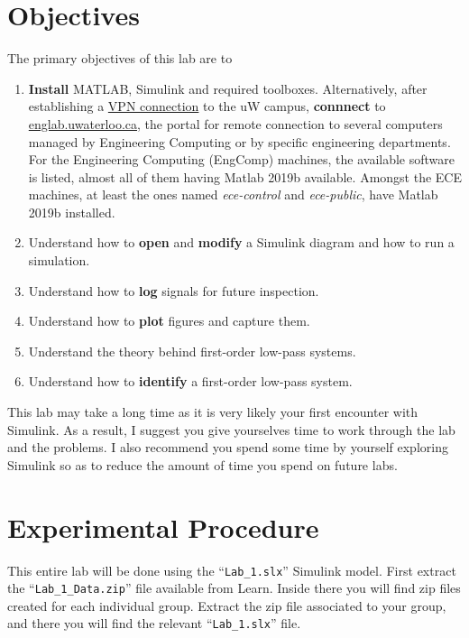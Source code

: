 \section{Objectives}
The primary objectives of this lab are to
\begin{enumerate}[label=(\arabic*)]
  \item{
    \textbf{Install} MATLAB, Simulink and required toolboxes.
    Alternatively, after establishing a \href{https://uwaterloo.ca/information-systems-technology/services/virtual-private-network-vpn/about-virtual-private-network-vpn} {VPN connection} to the uW campus, \textbf{connnect} to
    \url{englab.uwaterloo.ca}, the portal for remote connection to several computers managed by Engineering Computing or by specific engineering departments. For the Engineering Computing (EngComp) machines, the available software is listed, almost all of them having Matlab 2019b available. Amongst the ECE machines, at least the ones named \emph{ece-control} and \emph{ece-public}, have Matlab 2019b installed. 
  }
  \item{
    Understand how to \textbf{open} and \textbf{modify}
    a Simulink diagram and how to run a simulation.
  }
  \item{
    Understand how to \textbf{log} signals for future inspection.
  }
  \item{
    Understand how to \textbf{plot} figures and capture them.
  }
  \item{
    Understand the theory behind first-order low-pass systems.
  }
  \item{
    Understand how to \textbf{identify} a first-order low-pass system.
  }
\end{enumerate}
This lab may take a long time as it is very likely your first encounter with Simulink.
As a result, I suggest you give yourselves time to work through the lab and the problems.
I also recommend you spend some time by yourself exploring Simulink so as to reduce the amount of time you spend on future labs.

\section{Experimental Procedure}
This entire lab will be done using the ``\texttt{Lab\_1.slx}'' Simulink model.
First extract the ``\texttt{Lab\_1\_Data.zip}'' file available from Learn.
Inside there you will find zip files created for each individual group. Extract
the zip file associated to your group, and there you will find the relevant
``\texttt{Lab\_1.slx}'' file. 

